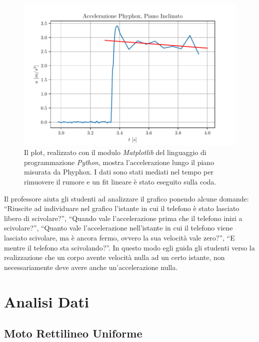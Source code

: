 \documentclass{report} \usepackage[T1]{fontenc} \usepackage[italian]{babel}
\begin{document}
\begin{figure}[H]
\centering
  \includegraphics[width=\textwidth]{a_phyphox}
  \caption{Il plot, realizzato con il modulo \emph{Matplotlib}
           del linguaggio di programmazione \emph{Python},
           mostra l'accelerazione lungo il piano misurata da
           Phyphox. I dati sono stati mediati nel tempo
           per rimuovere il rumore e un fit lineare è stato
           eseguito sulla coda.
          }
  \label{fig:a_phyphox}
\end{figure}

Il professore aiuta gli studenti ad analizzare il grafico ponendo
alcune domande: ``Riuscite ad individuare nel grafico l'istante
in cui il telefono è stato lasciato libero di scivolare?'',
``Quando vale l'accelerazione prima che il telefono inizi a
scivolare?'', ``Quanto vale l'accelerazione nell'istante
in cui il telefono viene lasciato scivolare, ma è ancora fermo,
ovvero la sua velocità vale zero?'', ``E mentre il telefono sta
scivolando?''. In questo modo egli guida gli studenti verso
la realizzazione che un corpo avente velocità nulla ad un certo
istante, non necessariamente deve avere anche un'accelerazione nulla.

\appendix
\chapter{Analisi Dati}
\section{Moto Rettilineo Uniforme}
\end{document}
